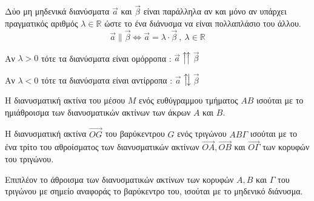 \documentclass[twoside,nofonts,internet,shmeiwseis]{thewria}
\begin{document}
Δύο μη μηδενικά διανύσματα $ \vec{a} $ και $ \vec{\beta} $ είναι παράλληλα αν και μόνο αν υπάρχει πραγματικός αριθμός $ \lambda\in\mathbb{R} $ ώστε το ένα διάνυσμα να είναι πολλαπλάσιο του άλλου.
\[ \vec{a}\parallel\vec{\beta}\Leftrightarrow \vec{a}=\lambda\cdot\vec{\beta}\ ,\ \lambda\in\mathbb{R} \]
\begin{rlist}
\item Αν $ \lambda>0 $ τότε τα διανύσματα είναι ομόρροπα : $ \vec{a}\upuparrows\vec{\beta} $
\item Αν $ \lambda<0 $ τότε τα διανύσματα είναι αντίρροπα : $ \vec{a}\updownarrows\vec{\beta} $
\end{rlist}
Η διανυσματική ακτίνα του μέσου $ M $ ενός ευθύγραμμου τμήματος $ AB $ ισούται με το ημιάθροισμα των διανυσματικών ακτίνων των άκρων $ A $ και $ B $.
\begin{center}
\end{center}
Η διανυσματική ακτίνα $ \overrightarrow{OG} $ του βαρύκεντρου $ G $ ενός τριγώνου $ AB\varGamma $ ισούται με το ένα τρίτο του αθροίσματος των διανυσματικών ακτίνων $ \overrightarrow{OA},\overrightarrow{OB} $ και $ \overrightarrow{O\varGamma} $ των κορυφών του τριγώνου.
\begin{center}
\end{center}
Επιπλέον το άθροισμα των διανυσματικών ακτίνων των κορυφών $ A,B $ και $ \varGamma $ του τριγώνου με σημείο αναφοράς το βαρύκεντρο του, ισούται με το μηδενικό διάνυσμα.
\end{document}

